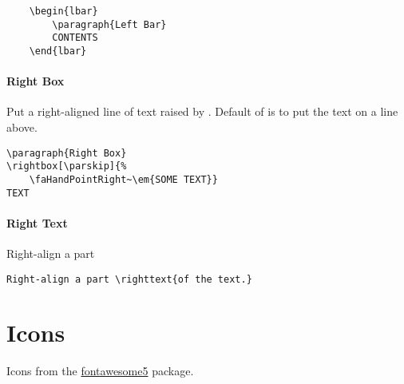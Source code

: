 \documentclass[itdr]{subfiles}
\begin{document}
\skipline[0.5\baselineskip]

\begin{lstlisting}
	\begin{lbar}
		\paragraph{Left Bar}
		CONTENTS
	\end{lbar}
\end{lstlisting}

\vfill

\paragraph{Right Box}
Put a right-aligned line of text raised by .
Default of  is \fbox{\lstinline!\\parskip!} to put the text on a \fbox{\lstinline!\\paragraph!} line above.

\skipline[0.5\baselineskip]

\begin{lstlisting}
\paragraph{Right Box}
\rightbox[\parskip]{%
	\faHandPointRight~\em{SOME TEXT}}
TEXT
\end{lstlisting}

\vfill

\paragraph{Right Text}

Right-align a part 

\begin{lstlisting}
Right-align a part \righttext{of the text.}
\end{lstlisting}

\vfill
\break

\section{Icons}

\icon{\faGem} Icons from the \href{https://ctan.org/pkg/fontawesome5}{fontawesome5} package.
\end{document}
